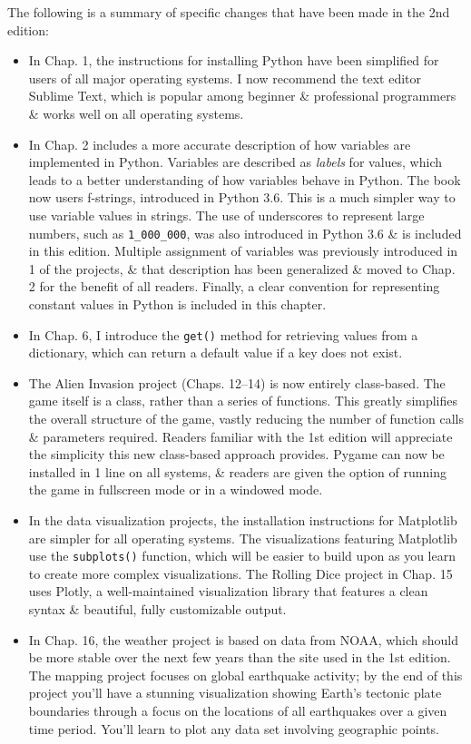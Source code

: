 \documentclass[oneside]{book}
\numberwithin{equation}{section}
\begin{document}
The following is a summary of specific changes that have been made in the 2nd edition:
\begin{itemize}
	\item In Chap. 1, the instructions for installing Python have been simplified for users of all major operating systems. I now recommend the text editor Sublime Text, which is popular among beginner \& professional programmers \& works well on all operating systems.
	\item In Chap. 2 includes a more accurate description of how variables are implemented in Python. Variables are described as \textit{labels} for values, which leads to a better understanding of how variables behave in Python. The book now users f-strings, introduced in Python 3.6. This is a much simpler way to use variable values in strings. The use of underscores to represent large numbers, such as \verb|1_000_000|, was also introduced in Python 3.6 \& is included in this edition. Multiple assignment of variables was previously introduced in 1 of the projects, \& that description has been generalized \& moved to Chap. 2 for the benefit of all readers. Finally, a clear convention for representing constant values in Python is included in this chapter.
	\item In Chap. 6, I introduce the \texttt{get()} method for retrieving values from a dictionary, which can return a default value if a key does not exist.
	\item The Alien Invasion project (Chaps. 12--14) is now entirely class-based. The game itself is a class, rather than a series of functions. This greatly simplifies the overall structure of the game, vastly reducing the number of function calls \& parameters required. Readers familiar with the 1st edition will appreciate the simplicity this new class-based approach provides. Pygame can now be installed in 1 line on all systems, \& readers are given the option of running the game in fullscreen mode or in a windowed mode.
	\item In the data visualization projects, the installation instructions for Matplotlib are simpler for all operating systems. The visualizations featuring Matplotlib use the \texttt{subplots()} function, which will be easier to build upon as you learn to create more complex visualizations. The Rolling Dice project in Chap. 15 uses Plotly, a well-maintained visualization library that features a clean syntax \& beautiful, fully customizable output.
	\item In Chap. 16, the weather project is based on data from NOAA, which should be more stable over the next few years than the site used in the 1st edition. The mapping project focuses on global earthquake activity; by the end of this project you'll have a stunning visualization showing Earth's tectonic plate boundaries through a focus on the locations of all earthquakes over a given time period. You'll learn to plot any data set involving geographic points.

\end{itemize}
\end{document}
